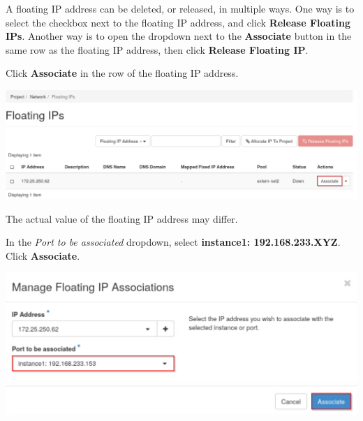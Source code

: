 \documentclass[letterpaper, 12pt]{article}
\begin{document}
\begin{enumerate}
    \begin{tipbox}
        A floating IP address can be deleted, or released, in multiple ways.
        One way is to select the checkbox next to the floating IP address, and click \textbf{Release Floating IPs}.
        Another way is to open the dropdown next to the \textbf{Associate} button in the same row as the floating IP address, then click \textbf{Release Floating IP}.
    \end{tipbox}

    \begin{labstep}
        Click \textbf{Associate} in the row of the floating IP address.

        \begin{center}
            \includegraphics[width=\linewidth]{images/part3/step6.png}
        \end{center}
    \end{labstep}

    \begin{notebox}
        The actual value of the floating IP address may differ.
    \end{notebox}

    \begin{labstep}
        In the \textit{Port to be associated} dropdown, select \textbf{instance1: 192.168.233.XYZ}.
        Click \textbf{Associate}.

        \begin{center}
            \includegraphics[width=\linewidth]{images/part3/step7.png}
        \end{center}
    \end{labstep}


\end{enumerate}
\end{document}
